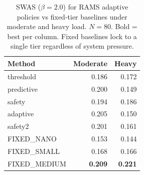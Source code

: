 \begin{table}[t]
\centering
\caption{SWAS ($\beta=2.0$) for RAMS adaptive policies vs fixed-tier baselines under moderate and heavy load. $N=80$. Bold = best per column. Fixed baselines lock to a single tier regardless of system pressure.}
\label{tab:exp7d_baselines}
\begin{tabular}{lrr}
\toprule
Method & Moderate & Heavy \\
\midrule
  threshold & 0.186 & 0.172 \\
  predictive & 0.200 & 0.149 \\
  safety & 0.194 & 0.186 \\
  adaptive & 0.205 & 0.150 \\
  safety2 & 0.201 & 0.161 \\
\midrule
  FIXED_NANO & 0.153 & 0.144 \\
  FIXED_SMALL & 0.168 & 0.166 \\
  FIXED_MEDIUM & \textbf{0.209} & \textbf{0.221} \\
\bottomrule
\end{tabular}
\end{table}
